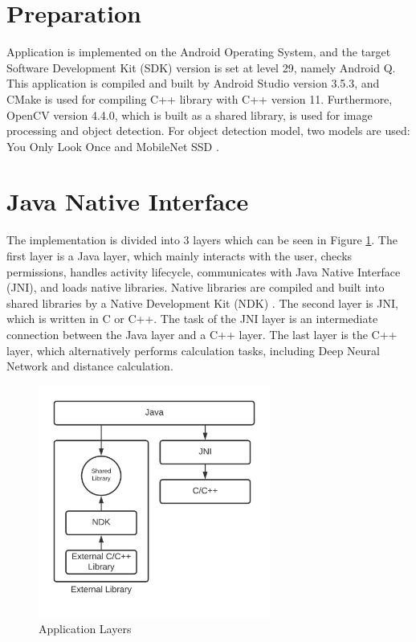     \section{Preparation}
        Application is implemented on the Android Operating System,
        and the target Software Development Kit (SDK) version is set at level 29, namely Android Q.
        This application is compiled and built by Android Studio version 3.5.3,
        and CMake is used for compiling C++ library with C++ version 11.
        Furthermore, OpenCV version 4.4.0, which is built as a shared library, is used for image processing and object detection.
        For object detection model, two models are used: You Only Look Once \cite{YOLO-v3} and MobileNet SSD \cite{mobilenet} \cite{ssd}.

    \section{Java Native Interface}
        The implementation is divided into 3 layers which can be seen in Figure \ref{applicationLayer}.
            The first layer is a Java layer, which mainly interacts with the user,
            checks permissions, handles activity lifecycle, communicates with Java Native Interface (JNI), and loads native libraries.
                Native libraries are compiled and built into shared libraries by a Native Development Kit (NDK) \cite{NDK-COOKBOOK}.
            The second layer is JNI, which is written in C or C++.
                The task of the JNI layer is an intermediate connection between the Java layer and a C++ layer.
            The last layer is the C++ layer, which alternatively performs calculation tasks,
            including Deep Neural Network and distance calculation.

        \begin{figure}[!ht]
            \centering
            \includegraphics[width=3in]{images/chapter3/application-layers.png}
            \caption{Application Layers}
            \label{applicationLayer}
        \end{figure}

